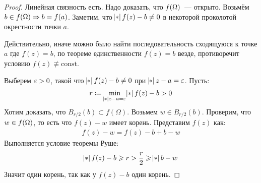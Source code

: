 \begin{proof}
    Линейная связность есть. Надо доказать, что $f(\Omega)$~--- открыто.
    Возьмём $b \in f(\Omega) \Rightarrow b = f(a)$.
    Заметим, что $\abs{f(z) - b} \ne 0$ в некоторой проколотой окрестности
    точки $a$. 
    
    Действительно, иначе можно было найти
    последовательность сходящуюся к точке $a$
    где $f(z) = b$, по теореме единственности $f(z) = b$
    везде, противоречит условию $f(z) \not\equiv \mathrm{const}$.

    Выберем $\varepsilon > 0$, такой что $\abs{f(z) - b} \ne 0$
    при $\abs{z-a}=\ve$. Пусть: 
    \begin{gather*}
        r \coloneqq \min\limits_{\abs{z-a}=\ve} \abs{f(z) - b} > 0
    \end{gather*}
    Хотим доказать, что $B_{r/2} (b) \subset f(\Omega)$.     
    Возьмем $w \in B_{r/2} (b)$.
    Проверим, что $w \in f(\Omega)$, то есть что
    $f(z) - w$ имеет корень. Представим $f(z)$ как: 
    \begin{gather*}
        f(z) - w = f(z) - b + b - w
    \end{gather*}
    Выполняется условие теоремы Руше: 
    \begin{gather*}
        \abs{f(z) - b} \ge r > \frac{r}{2} \ge \abs{b-w}
    \end{gather*}
    Значит один корень, так как у $f(z) - b$ один корень.
\end{proof}

\newpage
